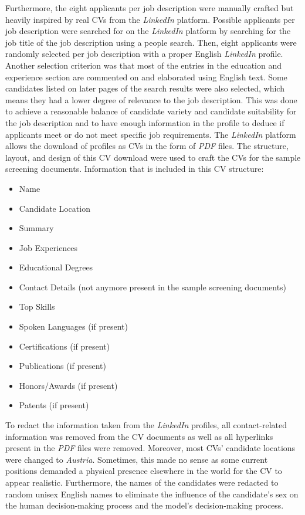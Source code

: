\documentclass[draft,final]{thesisclass} %
\begin{document}
Furthermore, the eight applicants per job description were manually crafted but heavily inspired by real \acs{CV}s from the \textit{LinkedIn} platform.
Possible applicants per job description were searched for on the \textit{LinkedIn} platform by searching for the job title of the job description using a people search.
Then, eight applicants were randomly selected per job description with a proper English \textit{LinkedIn} profile. Another selection criterion was that most of the entries in the education and experience section are commented on and elaborated using English text.
Some candidates listed on later pages of the search results were also selected, which means they had a lower degree of relevance to the job description.
This was done to achieve a reasonable balance of candidate variety and candidate suitability for the job description and to have enough information in the profile to deduce if applicants meet or do not meet specific job requirements.
The \textit{LinkedIn} platform allows the download of profiles as \acs{CV}s in the form of \textit{PDF} files.
The structure, layout, and design of this \acs{CV} download were used to craft the \acs{CV}s for the sample screening documents.
Information that is included in this \acs{CV} structure: \label{cv_structure}
\begin{itemize}
    \item Name
    \item Candidate Location
    \item Summary
    \item Job Experiences
    \item Educational Degrees
    \item Contact Details (not anymore present in the sample screening documents)
    \item Top Skills
    \item Spoken Languages (if present)
    \item Certifications (if present)
    \item Publications (if present)
    \item Honors/Awards (if present)
    \item Patents (if present)
\end{itemize}
To redact the information taken from the \textit{LinkedIn} profiles, all contact-related information was removed from the \acs{CV} documents as well as all hyperlinks present in the \textit{PDF} files were removed.
Moreover, most \acs{CV}s' candidate locations were changed to \textit{Austria}. Sometimes, this made no sense as some current positions demanded a physical presence elsewhere in the world for the \acs{CV} to appear realistic.
Furthermore, the names of the candidates were redacted to random unisex English names to eliminate the influence of the candidate's sex on the human decision-making process and the model's decision-making process.
\end{document}
